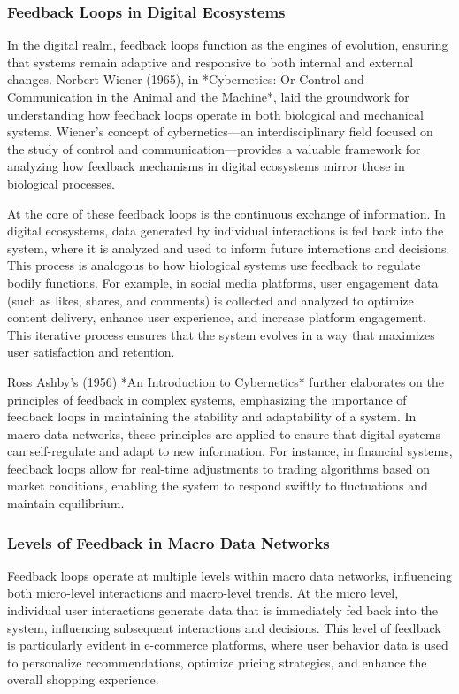 \documentclass[12pt,twoside]{article}
\begin{document}
\subsubsection{Feedback Loops in Digital Ecosystems}

In the digital realm, feedback loops function as the engines of evolution, ensuring that systems remain adaptive and responsive to both internal and external changes. Norbert Wiener (1965), in *Cybernetics: Or Control and Communication in the Animal and the Machine*, laid the groundwork for understanding how feedback loops operate in both biological and mechanical systems. Wiener’s concept of cybernetics—an interdisciplinary field focused on the study of control and communication—provides a valuable framework for analyzing how feedback mechanisms in digital ecosystems mirror those in biological processes.

At the core of these feedback loops is the continuous exchange of information. In digital ecosystems, data generated by individual interactions is fed back into the system, where it is analyzed and used to inform future interactions and decisions. This process is analogous to how biological systems use feedback to regulate bodily functions. For example, in social media platforms, user engagement data (such as likes, shares, and comments) is collected and analyzed to optimize content delivery, enhance user experience, and increase platform engagement. This iterative process ensures that the system evolves in a way that maximizes user satisfaction and retention.

Ross Ashby’s (1956) *An Introduction to Cybernetics* further elaborates on the principles of feedback in complex systems, emphasizing the importance of feedback loops in maintaining the stability and adaptability of a system. In macro data networks, these principles are applied to ensure that digital systems can self-regulate and adapt to new information. For instance, in financial systems, feedback loops allow for real-time adjustments to trading algorithms based on market conditions, enabling the system to respond swiftly to fluctuations and maintain equilibrium.

\subsubsection{Levels of Feedback in Macro Data Networks}

Feedback loops operate at multiple levels within macro data networks, influencing both micro-level interactions and macro-level trends. At the micro level, individual user interactions generate data that is immediately fed back into the system, influencing subsequent interactions and decisions. This level of feedback is particularly evident in e-commerce platforms, where user behavior data is used to personalize recommendations, optimize pricing strategies, and enhance the overall shopping experience.
\end{document}
